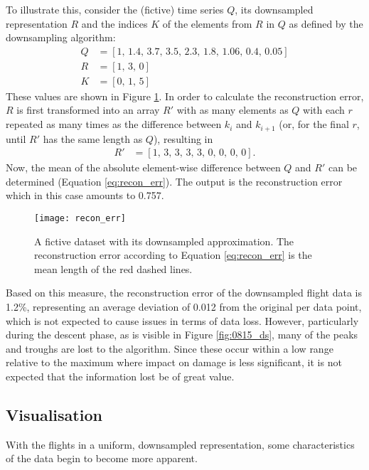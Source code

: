 To illustrate this, consider the (fictive) time series \(Q\), its downsampled representation \(R\) and the indices \(K\) of the elements from \(R\) in \(Q\) as defined by the downsampling algorithm:
\begin{align}
    Q & = [1,\,1.4,\,3.7,\,3.5,\,2.3,\,1.8,\,1.06,\,0.4,\,0.05] \\
    R & = [1,\,3,\,0] \\
    K & = [0,\,1,\,5]
\end{align}
These values are shown in Figure \ref{fig:recon_err}. In order to calculate the reconstruction error, \(R\) is first transformed into an array \(R'\) with as many elements as \(Q\) with each \(r\) repeated as many times as the difference between \(k_i\) and \(k_{i + 1}\) (or, for the final \(r\), until \(R'\) has the same length as \(Q\)), resulting in
\begin{align}
    R' & = [1,\,3,\,3,\,3,\,3,\,0,\,0,\,0,\,0].
\end{align}
Now, the mean of the absolute element-wise difference between \(Q\) and \(R'\) can be determined (Equation \ref{eq:recon_err}). The output is the reconstruction error which in this case amounts to 0.757.

\begin{figure}
    \centering
    \texttt{[image: recon\_err]}
    \caption{\label{fig:recon_err} A fictive dataset with its downsampled approximation. The reconstruction error according to Equation \ref{eq:recon_err} is the mean length of the red dashed lines.}
\end{figure}

Based on this measure, the reconstruction error of the downsampled flight data is 1.2\%, representing an average deviation of 0.012 from the original per data point, which is not expected to cause issues in terms of data loss. However, particularly during the descent phase, as is visible in Figure \ref{fig:0815_ds}, many of the peaks and troughs are lost to the algorithm. Since these occur within a low range relative to the maximum where impact on damage is less significant, it is not expected that the information lost be of great value.

\subsection{Visualisation}
With the flights in a uniform, downsampled representation, some characteristics of the data begin to become more apparent.

